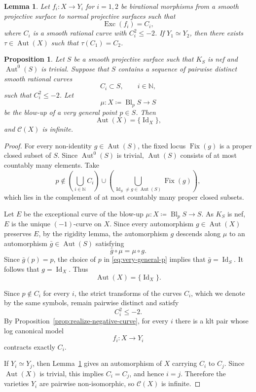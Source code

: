 \documentclass[10pt,a4paper]{amsart}
\newtheorem{proposition}{Proposition}
\newtheorem{lemma}{Lemma}
\newcommand{\Aut}{\operatorname{Aut}}
\newcommand{\CC}{\mathcal{C}}
\newcommand{\Exc}{\operatorname{Exc}}
\newcommand{\Id}{\operatorname{Id}}
\begin{document}
\begin{lemma}\label{lem:lifting-minimal-resolutions}
Let $f_i\colon X\to Y_i$ for $i=1,2$ be birational morphisms from a
smooth projective surface to normal projective surfaces such that
\[
\Exc(f_i)=C_i,
\]
where $C_i$ is a smooth rational curve with $C_i^2\leq-2$. If $Y_1\simeq Y_2$, then there exists $\tau \in \Aut(X)$ such that $\tau(C_1)=C_2$.
\end{lemma}

\begin{proposition}\label{prop:very-general-blowup}
Let \(S\) be a smooth projective surface such that \(K_S\) is nef and
\(\Aut^0(S)\) is trivial. Suppose that \(S\) contains a sequence of pairwise
distinct smooth rational curves
\[
C_i\subset S,\qquad i\in\mathbb N,
\]
such that \(C_i^2\leq -2\). Let
\[
\mu\colon X\coloneqq\operatorname{Bl}_pS\longrightarrow S
\]
be the blow-up of a very general point $p\in S$. Then
\[
\Aut(X)=\{\Id_X\},
\]
and $\CC(X)$ is infinite.
\end{proposition}

\begin{proof}
For every non-identity \(g\in\Aut(S)\), the fixed locus \(\operatorname{Fix}(g)\) is a
proper closed subset of \(S\). Since \(\Aut^0(S)\) is trivial, $\Aut(S)$ consists of at most countably many elements. Take
\begin{equation}\label{eq:very-general-p}
p\notin
\left(\bigcup_{i\in\mathbb N}C_i\right)
\cup
\left(\bigcup_{\Id_S\neq g\in\Aut(S)}\operatorname{Fix}(g)\right),
\end{equation}
which lies in the complement of at most countably many proper closed subsets.

Let \(E\) be the exceptional curve of the blow-up \(\mu\colon X\coloneqq\operatorname{Bl}_pS\to S\). As \(K_S\) is nef, \(E\) is the
unique \((-1)\)-curve on \(X\). Since every automorphism \(g\in\Aut(X)\) preserves \(E\), by the rigidity lemma, the automorphism \(g\) descends along \(\mu\) to an
automorphism \(\bar g\in\Aut(S)\) satisfying
\[
\bar g\circ\mu=\mu\circ g.
\]
Since \(\bar g(p)=p\), the choice of \(p\) in
\eqref{eq:very-general-p} implies that \(\bar g=\Id_S\). It follows that
\(g=\Id_X\). Thus
\[
\Aut(X)=\{\Id_X\}.
\]

Since \(p\notin C_i\) for every \(i\), the strict transforms of the curves
\(C_i\), which we denote by the same symbols, remain pairwise distinct and
satisfy
\[
C_i^2\leq-2.
\]
By Proposition~\ref{prop:realize-negative-curve}, for every \(i\) there is a klt pair
whose log canonical model
\[
f_i\colon X\longrightarrow Y_i
\]
contracts exactly \(C_i\).

If \(Y_i\simeq Y_j\), then Lemma~\ref{lem:lifting-minimal-resolutions} gives an
automorphism of \(X\) carrying \(C_i\) to \(C_j\). Since \(\Aut(X)\) is
trivial, this implies \(C_i=C_j\), and hence \(i=j\). Therefore the varieties
\(Y_i\) are pairwise non-isomorphic, so \(\CC(X)\) is infinite.
\end{proof}
\end{document}

